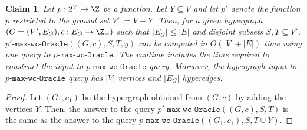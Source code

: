 \documentclass{article}
\newtheorem{claim}{Claim}[section]
\newcommand{\functionMaximizationOracle}[1]{\ensuremath{{#1}\text{-}\mathtt{max}\text{-}\mathtt{wc}\text{-}\mathtt{Oracle}}\xspace}
\begin{document}
\begin{claim}\label{claim:FunctionMaximizetionOracles:computing-maximal-tight-sets:maximization-oracle-for-restriction}
    Let $p:2^V\rightarrow\Z$ be a function. Let $Y \subseteq V$ and let $p'$ denote the function $p$ restricted to the ground set $V':=V - Y$. Then, for a given hypergraph $(G = (V', E_G), c:E_G\rightarrow\Z_+)$ such that $|E_G| \leq |E|$ and disjoint subsets $S, T \subseteq V'$, $\functionMaximizationOracle{p'}((G,c), S, T, y)$ can be computed in $O(|V| + |E|)$ time using one query to $\functionMaximizationOracle{p}$.
    The runtime includes the time required to construct the input to \functionMaximizationOracle{p} query. Moreover, the hypergraph input to \functionMaximizationOracle{p} query has $|V|$ vertices and $|E_G|$ hyperedges.
\end{claim}
\begin{proof}
    Let $(G_1, c_1)$ be the hypergraph obtained from $(G,c)$ by adding the vertices $Y$. Then, the answer to the query $\functionMaximizationOracle{p'}((G, c), S, T)$ is the same as the answer to the query $\functionMaximizationOracle{p}((G_1, c_1), S, T\cup Y)$.
\end{proof}
\end{document}
